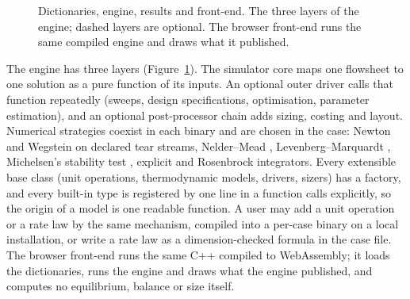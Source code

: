 \documentclass[preprint,12pt]{elsarticle}
\newcommand{\code}[1]{\texttt{\detokenize{#1}}}
\begin{document}
\begin{figure}[t]
\centering
{\renewcommand{\tiny}{\scriptsize}%
\makebox[\linewidth]{\resizebox{1.16\linewidth}{!}{}}}
\caption{Dictionaries, engine, results and front-end.  The three layers of
the engine; dashed layers are optional.  The browser front-end runs the
same compiled engine and draws what it published.}
\label{fig:arch}
\end{figure}

The engine has three layers (Figure~\ref{fig:arch}).  The simulator core
maps one flowsheet to one solution as a pure function of its inputs.  An
optional outer driver calls that function repeatedly (sweeps, design
specifications, optimisation, parameter estimation), and an optional
post-processor chain adds sizing, costing and layout.  Numerical strategies
coexist in each binary and are chosen in the case: Newton and Wegstein
\citep{wegstein1958} on declared tear streams, Nelder--Mead
\citep{nelder1965}, Levenberg--Marquardt \citep{marquardt1963}, Michelsen's
stability test \citep{michelsen1982}, explicit and Rosenbrock integrators.
Every extensible base class (unit operations, thermodynamic models, drivers,
sizers) has a factory, and every built-in type is registered by one line in
a function \code{main()} calls explicitly, so the origin of a model is one
readable function.  A user may add a unit operation or a rate law by the
same mechanism, compiled into a per-case binary on a local installation,
or write a rate law as a dimension-checked formula in the case file.  The
browser front-end runs the same C++ compiled to WebAssembly; it loads the
dictionaries, runs the engine and draws what the engine published, and
computes no equilibrium, balance or size itself.
\end{document}
